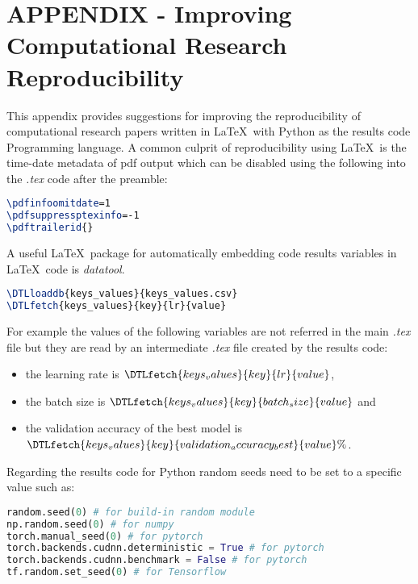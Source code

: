 \documentclass[journal]{IEEEtran}
\begin{document}
\section{APPENDIX - Improving Computational Research Reproducibility}
This appendix provides suggestions for improving the reproducibility of computational research papers written in \LaTeX\ with Python as the results code Programming language.
A common culprit of reproducibility using \LaTeX\ is the time-date metadata of pdf output which can be disabled using the following into the \textit{.tex} code after the preamble:
\begin{lstlisting}[language=TeX, style=lststyle, caption={\LaTeX\ pdf reproducibility commands for preamble.}, captionpos=b]
\pdfinfoomitdate=1
\pdfsuppressptexinfo=-1
\pdftrailerid{}
\end{lstlisting}

A useful \LaTeX\ package for automatically embedding code results variables in \LaTeX\ code is \textit{datatool}.
\begin{lstlisting}[language=TeX, style=lststyle, caption={\LaTeX\ datatool example of loading a file that contains pairs of keys and values (keys\_values.csv) generated by a results code and getting the value of a key named lr.}, captionpos=b]
\DTLloaddb{keys_values}{keys_values.csv}
\DTLfetch{keys_values}{key}{lr}{value}
\end{lstlisting}

For example the values of the following variables are not referred in the main \textit{.tex} file but they are read by an intermediate \textit{.tex} file created by the results code:
\begin{itemize}
	\item the learning rate is $\DTLfetch{keys_values}{key}{lr}{value}$,
	\item the batch size is $\DTLfetch{keys_values}{key}{batch_size}{value}$ and
	\item the validation accuracy of the best model is $\DTLfetch{keys_values}{key}{validation_accuracy_best}{value}\%$.
\end{itemize}

Regarding the results code for Python random seeds need to be set to a specific value such as:
\begin{lstlisting}[language=python, style=lststyle, caption={Python reproducibility commands for some popular libraries.}, captionpos=b]
random.seed(0) # for build-in random module
np.random.seed(0) # for numpy
torch.manual_seed(0) # for pytorch
torch.backends.cudnn.deterministic = True # for pytorch
torch.backends.cudnn.benchmark = False # for pytorch
tf.random.set_seed(0) # for Tensorflow
\end{lstlisting}
\end{document}
